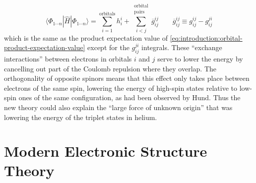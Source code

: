 \begin{equation}
    \label{eq:introduction:determinant-expectation-value}
    \langle \Phi_{1\cdots n}|
    \hat{H}
    |\Phi_{1\cdots n} \rangle
    =
    \sum_{i=1}^\mathrm{orbitals}
    h_i^i
    +
    \sum_{i<j}^{\substack{\mathrm{orbital}\\\mathrm{pairs}}}
    \overline{g}_{ij}^{ij}
    \qquad
    \overline{g}_{ij}^{ij}
    \equiv
    g_{ij}^{ij}
    -
    g_{ij}^{ji}
\end{equation}
which is the same as the product expectation value of
\cref{eq:introduction:orbital-product-expectation-value} except for the
\(
    g_{ij}^{ji}
\)
integrals.
These ``exchange interactions'' between electrons in orbitals \(i\) and \(j\)
serve to lower the energy by cancelling out part of the Coulomb repulsion where
they overlap.
The orthogonality of opposite spinors means that this effect only takes place
between electrons of the same spin, lowering the energy of high-spin states
relative to low-spin ones of the same configuration, as had been observed by
Hund.\cite{Hund:1925p345}
Thus the new theory could also explain the ``large force of unknown
origin''\cite{Mehra:1982} that was lowering the energy of the triplet states in
helium.


\section{Modern Electronic Structure Theory}

